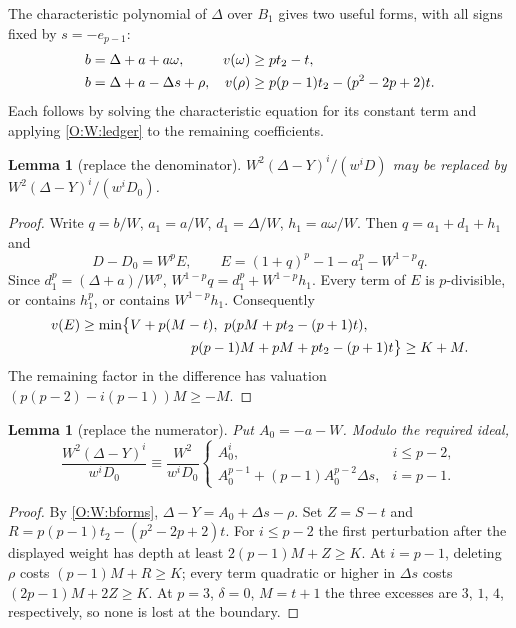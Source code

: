 \documentclass[11pt]{amsart}
\newtheorem{lemma}[theorem]{Lemma}
\theoremstyle{definition}
\theoremstyle{remark}
\begin{document}
The characteristic polynomial of $\Delta$ over $B_1$ gives two useful
forms, with all signs fixed by $s=-e_{p-1}$:
\begin{align}\label{O:W:bforms}
 b&=\Delta+a+a\omega,& v(\omega)&\ge pt_2-t,\notag\\
 b&=\Delta+a-\Delta s+\rho,&
 v(\rho)&\ge p(p-1)t_2-(p^2-2p+2)t.
\end{align}
Each follows by solving the characteristic equation for its constant
term and applying \eqref{O:W:ledger} to the remaining coefficients.

\begin{lemma}[replace the denominator]\label{O:W:den}
$W^2(\Delta-Y)^i/(w^iD)$ may be replaced by
$W^2(\Delta-Y)^i/(w^iD_0)$.
\end{lemma}
\begin{proof}
Write $q=b/W$, $a_1=a/W$, $d_1=\Delta/W$, $h_1=a\omega/W$.
Then $q=a_1+d_1+h_1$ and
\[
 D-D_0=W^p E,\qquad
 E=(1+q)^p-1-a_1^p-W^{1-p}q.
\]
Since $d_1^p=(\Delta+a)/W^p$,
$W^{1-p}q=d_1^p+W^{1-p}h_1$. Every term of $E$ is $p$-divisible,
or contains $h_1^p$, or contains $W^{1-p}h_1$. Consequently
\[
 \begin{aligned}
 v(E)&\ge\min\bigl\{V+p(M-t),\ p(pM+pt_2-(p+1)t),\\
 &\hspace{28mm}p(p-1)M+pM+pt_2-(p+1)t\bigr\}\ge K+M.
\end{aligned}
\]
The remaining factor in the difference has valuation
$(p(p-2)-i(p-1))M\ge-M$.
\end{proof}

\begin{lemma}[replace the numerator]\label{O:W:numerator}
Put $A_0=-a-W$. Modulo the required ideal,
\[
 \frac{W^2(\Delta-Y)^i}{w^iD_0}
 \equiv\frac{W^2}{w^iD_0}
 \begin{cases}
 A_0^i,&i\le p-2,\\
 A_0^{p-1}+(p-1)A_0^{p-2}\Delta s,&i=p-1.
 \end{cases}
\]
\end{lemma}
\begin{proof}
By \eqref{O:W:bforms}, $\Delta-Y=A_0+\Delta s-\rho$.
Set $Z=S-t$ and $R=p(p-1)t_2-(p^2-2p+2)t$.
For $i\le p-2$ the first perturbation after the displayed weight has
depth at least $2(p-1)M+Z\ge K$.
At $i=p-1$, deleting $\rho$ costs $(p-1)M+R\ge K$;
every term quadratic or higher in $\Delta s$ costs
$(2p-1)M+2Z\ge K$. At $p=3$, $\delta=0$, $M=t+1$ the
three excesses are $3$, $1$, $4$, respectively, so none is lost at
the boundary.
\end{proof}
\end{document}
